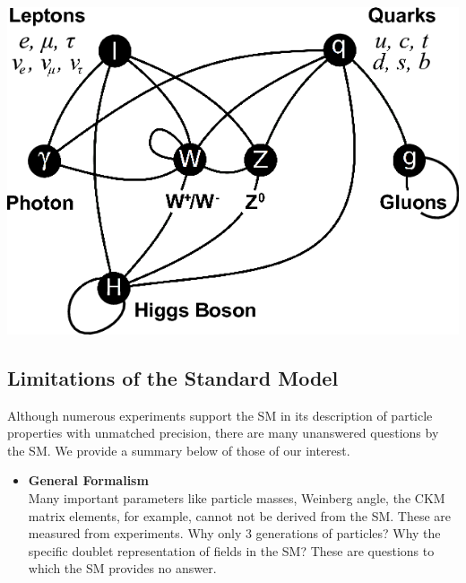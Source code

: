 {\begin{center}
\centering
\includegraphics[scale=0.5]{THESISPLOTS/SM_Particles.png}%
\label{fig:ALLSM}
\end{center}

\clearpage

\subsection{Limitations of the Standard Model }
Although numerous experiments support the SM in its description of particle properties with unmatched precision, there are many unanswered questions by the SM. We provide a summary below of those of our interest.
\begin{itemize}
\item \textbf{General Formalism} \mbox{}\\ Many important parameters like particle masses, Weinberg angle, the CKM matrix elements, for example, cannot not be derived from the SM. These are measured from experiments. Why only 3 generations of particles? 
Why the specific doublet representation of fields in the SM? These are questions to which the SM provides no answer.


\end{itemize}}
